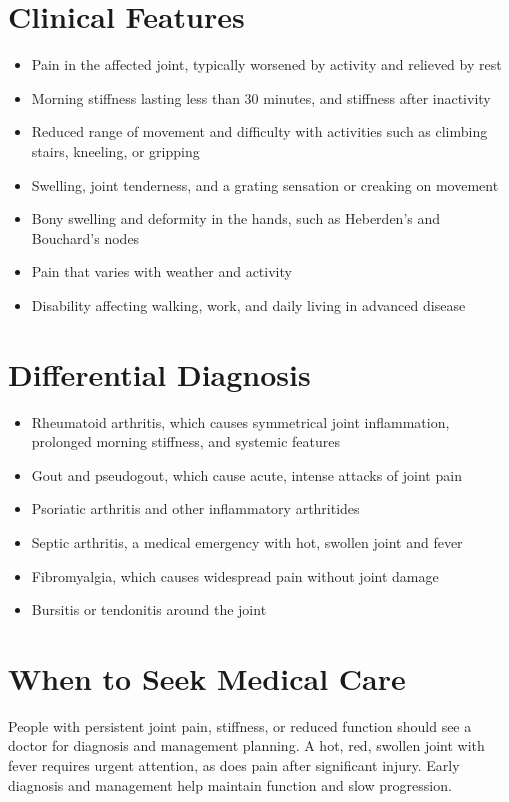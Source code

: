 \section*{Clinical Features}
\begin{itemize}
    \item Pain in the affected joint, typically worsened by activity and relieved by rest
    \item Morning stiffness lasting less than 30 minutes, and stiffness after inactivity
    \item Reduced range of movement and difficulty with activities such as climbing stairs, kneeling, or gripping
    \item Swelling, joint tenderness, and a grating sensation or creaking on movement
    \item Bony swelling and deformity in the hands, such as Heberden's and Bouchard's nodes
    \item Pain that varies with weather and activity
    \item Disability affecting walking, work, and daily living in advanced disease
\end{itemize}

\section*{Differential Diagnosis}
\begin{itemize}
    \item Rheumatoid arthritis, which causes symmetrical joint inflammation, prolonged morning stiffness, and systemic features
    \item Gout and pseudogout, which cause acute, intense attacks of joint pain
    \item Psoriatic arthritis and other inflammatory arthritides
    \item Septic arthritis, a medical emergency with hot, swollen joint and fever
    \item Fibromyalgia, which causes widespread pain without joint damage
    \item Bursitis or tendonitis around the joint
\end{itemize}

\section*{When to Seek Medical Care}
People with persistent joint pain, stiffness, or reduced function should see a doctor for diagnosis and management planning. A hot, red, swollen joint with fever requires urgent attention, as does pain after significant injury. Early diagnosis and management help maintain function and slow progression.

